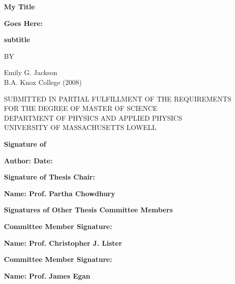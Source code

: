 \begin{center}
\par
\vspace*{0.5in}
{\bf\large My Title}
\par
\vspace{0.15in}
{\bf\large Goes Here:}
\par
\vspace{0.15in}
{\bf\large subtitle}
\par
\vspace{0.2in}
{\bf\large }
\par
\vspace{0.6in}
{ BY}
\par
\vspace{0.6in}
{Emily G. Jackson	}\\
{B.A. Knox College (2008)}
\par
\vspace{0.6in}
{SUBMITTED IN PARTIAL FULFILLMENT OF THE REQUIREMENTS}\\
{FOR THE DEGREE OF MASTER OF SCIENCE}\\
{DEPARTMENT OF PHYSICS AND APPLIED PHYSICS}\\
{UNIVERSITY OF MASSACHUSETTS LOWELL}
\end{center}
\par
\vspace{0.75in}
{\bf Signature of}
\par
\vspace{0.15in}
{\bf Author: \underline{\hspace{2.925in}} Date: \underline{\hspace{1.1in}}}
\par
\vspace{0.25in}
{\bf Signature of Thesis Chair: \underline{\hspace{3.1in}}}
\par
\vspace{0.15in}
{\bf Name: Prof. Partha Chowdhury}
\par
\vspace{0.25in}
{\bf Signatures of Other Thesis Committee Members}
\par
\vspace{0.20in}
{\bf Committee Member Signature: \underline{\hspace{2.70in}}}
\par
\vspace{0.15in}
{\bf Name: Prof. Christopher J. Lister}
\par
\vspace{0.25in}
{\bf Committee Member Signature: \underline{\hspace{2.70in}}}
\par
\vspace{0.15in}
{\bf Name: Prof. James Egan}